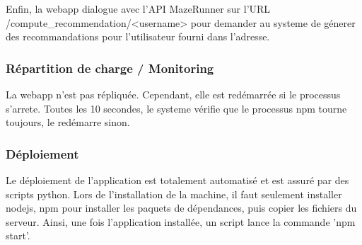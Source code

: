 Enfin, la webapp dialogue avec l'API MazeRunner sur l'URL /compute\_recommendation/<username> pour demander au systeme de génerer des recommandations pour l'utilisateur fourni dans l'adresse.

\subsubsection{Répartition de charge / Monitoring}

La webapp n'est pas répliquée. Cependant, elle est redémarrée si le processus s'arrete. Toutes les 10 secondes, le systeme vérifie que le processus npm tourne toujours, le redémarre sinon.

\subsubsection{Déploiement}

Le déploiement de l'application est totalement automatisé et est assuré par des scripts python.
Lors de l'installation de la machine, il faut seulement installer nodejs, npm pour installer les paquets de dépendances, puis copier les fichiers du serveur.
Ainsi, une fois l'application installée, un script lance la commande 'npm start'.
